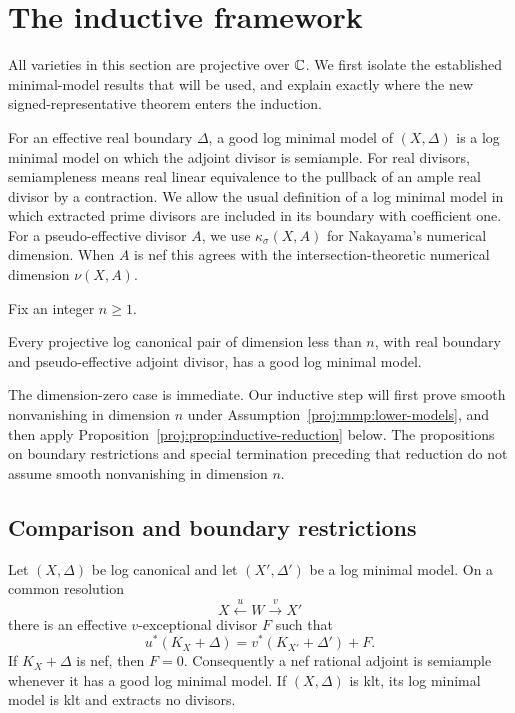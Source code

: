 \section{The inductive framework}\label{proj:sec:induction}

All varieties in this section are projective over \(\mathbb{C}\).
We first isolate the established minimal-model results that will be
used, and explain exactly where the new signed-representative theorem
enters the induction.

For an effective real boundary \(\Delta\), a good log minimal model of
\((X,\Delta)\) is a log minimal model on which the adjoint divisor is
semiample. For real divisors, semiampleness means real linear equivalence
to the pullback of an ample real divisor by a contraction. We allow the
usual definition of a log minimal model in which extracted prime
divisors are included in its boundary with coefficient one.
For a pseudo-effective divisor \(A\), we use
\(\kappa_\sigma(X,A)\) for Nakayama's numerical dimension. When \(A\)
is nef this agrees with the intersection-theoretic numerical dimension
\(\nu(X,A)\).

Fix an integer \(n\geq 1\).
\begin{assumption}\label{proj:mmp:lower-models}
Every projective log canonical pair of dimension less than \(n\),
with real boundary and pseudo-effective adjoint divisor, has a good
log minimal model.
\end{assumption}

The dimension-zero case is immediate. Our inductive step will first
prove smooth nonvanishing in dimension \(n\) under
Assumption~\ref{proj:mmp:lower-models}, and then apply
Proposition~\ref{proj:prop:inductive-reduction} below.
The propositions on boundary restrictions and special termination
preceding that reduction do not assume smooth nonvanishing in
dimension \(n\).

\subsection{Comparison and boundary restrictions}

\begin{lemma}\label{proj:mmp:comparison}
Let \((X,\Delta)\) be log canonical and let \((X',\Delta')\)
be a log minimal model. On a common resolution
\[
 X \xleftarrow{u} W \xrightarrow{v} X'
\]
there is an effective \(v\)-exceptional divisor \(F\) such that
\begin{equation}\label{proj:mmp:comparison-equation}
 u^*(K_X+\Delta)=v^*(K_{X'}+\Delta')+F.
\end{equation}
If \(K_X+\Delta\) is nef, then \(F=0\). Consequently a nef
rational adjoint is semiample whenever it has a good log minimal
model. If \((X,\Delta)\) is klt, its log minimal model is klt and
extracts no divisors.
\end{lemma}

